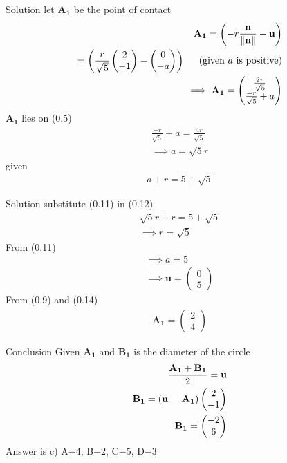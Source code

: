\documentclass{beamer}
\numberwithin{equation}{section}
\providecommand{\brak}[1]{\ensuremath{\left(#1\right)}}
\theoremstyle{remark}
\providecommand{\norm}[1]{\lVert#1\rVert}
\newcommand{\myvec}[1]{\ensuremath{\begin{pmatrix}#1\end{pmatrix}}}
\let\vec\mathbf
\begin{document}
\begin{frame}{Solution}
let $\vec{A_1}$ be the point of contact
\begin{align}
    \vec{A_1}=\brak{-r \frac{\vec{n}}{\norm{\vec{n}}}-\vec{u}}\\
    =\brak{\frac{r}{\sqrt{5}}\myvec{2\\-1}-\myvec{0\\-a}} \hspace{0.5cm} \brak{\text{given }a \text{ is positive}}\\
    \implies \vec{A_1}=\myvec{\frac{2r}{\sqrt{5}}\\ \frac{-r}{\sqrt{5}}+a}
\end{align}
$\vec{A_1}$ lies on (0.5) 
\begin{align}
    \frac{-r}{\sqrt{5}} + a=\frac{4r}{\sqrt{5}}\\
    \implies a=\sqrt{5}r
\end{align}
given 
\begin{align}
a + r = 5 + \sqrt{5}
\end{align}
\end{frame}

\begin{frame}{Solution}
substitute (0.11) in (0.12)
\begin{align}
\sqrt{5}r +r =5 +\sqrt{5}\\
    \implies r=\sqrt{5}
\end{align}
From (0.11)
\begin{align}
    \implies a=5\\
    \implies \vec{u}=\myvec{0\\5}
\end{align}
	From (0.9) and (0.14)
\begin{align}
    \vec{A_1}=\myvec{2\\4}
\end{align}
\end{frame}

\begin{frame}{Conclusion}
Given  $\vec{A_1}$ and $\vec{B_1}$ is the diameter of the circle 
\begin{align}
    \frac{\vec{A_1}+\vec{B_1}}{2}=\vec{u}\\
    \vec{B_1}=\brak{\vec{u} \hspace{0.5cm} \vec{A_1}}\myvec{2\\-1}\\
    \vec{B_1}=\myvec{-2\\6}
\end{align}
Answer is c) A$- 4$, B$- 2$, C$- 5$, D$- 3$
\end{frame}
\end{document}
